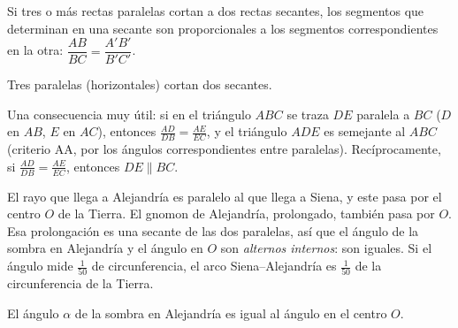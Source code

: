 \documentclass[11pt]{article}
\begin{document}
\begin{teorema}
Si tres o más rectas paralelas cortan a dos rectas secantes, los segmentos que
determinan en una secante son proporcionales a los segmentos correspondientes en la
otra: $\dfrac{AB}{BC} = \dfrac{A'B'}{B'C'}$.
\end{teorema}

\begin{center}

{\small Tres paralelas (horizontales) cortan dos secantes.}
\end{center}

Una consecuencia muy útil: si en el triángulo $ABC$ se traza $DE$ paralela a $BC$
($D$ en $AB$, $E$ en $AC$), entonces $\frac{AD}{DB} = \frac{AE}{EC}$, y el triángulo
$ADE$ es semejante al $ABC$ (criterio AA, por los ángulos correspondientes entre
paralelas). Recíprocamente, si $\frac{AD}{DB} = \frac{AE}{EC}$, entonces $DE \parallel BC$.

\begin{ejemplo}
El rayo que llega a Alejandría es paralelo al que llega a Siena, y este pasa por el
centro $O$ de la Tierra. El gnomon de Alejandría, prolongado, también pasa por $O$.
Esa prolongación es una secante de las dos paralelas, así que el ángulo de la sombra
en Alejandría y el ángulo en $O$ son \emph{alternos internos}: son iguales. Si el
ángulo mide $\frac{1}{50}$ de circunferencia, el arco Siena--Alejandría es
$\frac{1}{50}$ de la circunferencia de la Tierra.
\begin{center}

{\small El ángulo $\alpha$ de la sombra en Alejandría es igual al ángulo en el centro $O$.}
\end{center}
\end{ejemplo}
\end{document}
